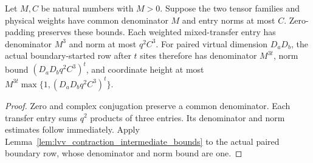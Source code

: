 \begin{lemma}
    \label{lem:lvv_weighted_transfer_intermediate_bounds}
    \leanok
    Let $M,C$ be natural numbers with $M>0$.
    Suppose the two tensor families and physical weights have common
    denominator $M$ and entry norms at most $C$.
    Zero-padding preserves these bounds. Each weighted mixed-transfer
    entry has denominator $M^3$ and norm at most $q^2C^3$.
    For paired virtual dimension $D_aD_b$, the actual boundary-started
    row after $t$ sites therefore has denominator $M^{3t}$, norm bound
    $(D_aD_bq^2C^3)^t$, and coordinate height at most
    $M^{3t}\max\{1,(D_aD_bq^2C^3)^t\}$.
\end{lemma}
\begin{proof}\leanok
    Zero and complex conjugation preserve a common denominator.
    Each transfer entry sums $q^2$ products of three entries. Its
    denominator and norm estimates follow immediately. Apply
    Lemma~\ref{lem:lvv_contraction_intermediate_bounds} to the actual
    paired boundary row, whose denominator and norm bound are one.
\end{proof}

